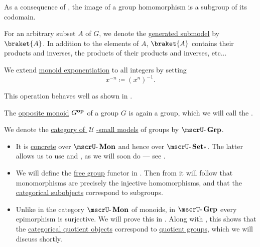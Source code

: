 \begin{definition}
\begin{thmenum}
    As a consequence of , the image of a group homomorphism is a subgroup of its codomain.

     For an arbitrary subset \( A \) of \( G \), we denote the \hyperref[def:first_order_generated_substructure]{generated submodel} by \( \braket{ A } \). In addition to the elements of \( A \), \( \braket{ A } \) contains their products and inverses, the products of their products and inverses, etc...

     We extend \hyperref[def:monoid/exponentiation]{monoid exponentiation} to all integers by setting
    \begin{equation}\label{eq:def:group/exponentiation}
      x^{-n} \coloneqq (x^n)^{-1}.
    \end{equation}

    This operation behaves well as shown in .

    \mimprovised The \hyperref[def:monoid/opposite]{opposite monoid} \( G^\oppos \) of a group \( G \) is again a group, which we will call the .

     We denote the \hyperref[def:category_of_small_first_order_models]{category of \( \mscrU \)-small models} of groups by \( \ucat{Grp} \).

    \begin{itemize}
      \item It is \hyperref[def:concrete_category]{concrete} over \hyperref[def:monoid/category]{\( \ucat{Mon} \)} and hence over \hyperref[def:pointed_set/category]{\( \ucat{Set_*} \)}. The latter allows us to use  and , as we will soon do --- see .

      \item We will define the \hyperref[def:free_group]{free group} functor in . Then from  it will follow that monomorphisms are precisely the injective homomorphisms, and that the \hyperref[def:subobject_and_quotient]{categorical subobjects} correspond to subgroups.

      \item Unlike in the category \hyperref[def:monoid/category]{\( \ucat{Mon} \)} of monoids, in \( \ucat{Grp} \) every epimorphism is surjective. We will prove this in . Along with , this shows that the \hyperref[def:subobject_and_quotient]{categorical quotient objects} correspond to \hyperref[def:group/quotient]{quotient groups}, which we will discuss shortly.


\end{itemize}
\end{thmenum}
\end{definition}

